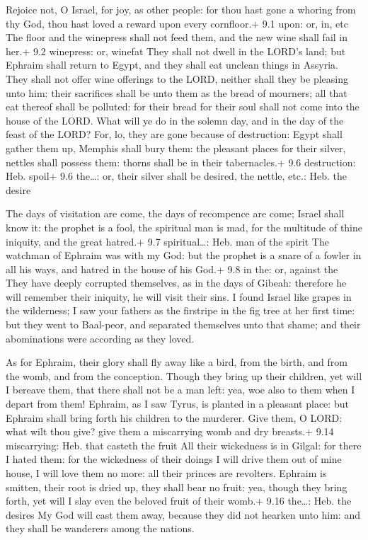  Rejoice not, O Israel, for joy, as other people: for thou
hast gone a whoring from thy God, thou hast loved a reward upon every
cornfloor.+ 9.1 upon: or, in, etc  The floor and the
winepress shall not feed them, and the new wine shall fail in her.+ 9.2
winepress: or, winefat  They shall not dwell in the LORD's
land; but Ephraim shall return to Egypt, and they shall eat unclean
things in Assyria.  They shall not offer wine offerings to
the LORD, neither shall they be pleasing unto him: their sacrifices
shall be unto them as the bread of mourners; all that eat thereof shall
be polluted: for their bread for their soul shall not come into the
house of the LORD.  What will ye do in the solemn day, and
in the day of the feast of the LORD?  For, lo, they are gone
because of destruction: Egypt shall gather them up, Memphis shall bury
them: the pleasant places for their silver, nettles shall possess them:
thorns shall be in their tabernacles.+ 9.6 destruction: Heb. spoil+ 9.6
the\ldots: or, their silver shall be desired, the nettle, etc.: Heb. the
desire

 The days of visitation are come, the days of recompence are
come; Israel shall know it: the prophet is a fool, the spiritual man is
mad, for the multitude of thine iniquity, and the great hatred.+ 9.7
spiritual\ldots: Heb. man of the spirit  The watchman of
Ephraim was with my God: but the prophet is a snare of a fowler in all
his ways, and hatred in the house of his God.+ 9.8 in the: or, against
the  They have deeply corrupted themselves, as in the days
of Gibeah: therefore he will remember their iniquity, he will visit
their sins.  I found Israel like grapes in the wilderness;
I saw your fathers as the firstripe in the fig tree at her first time:
but they went to Baal-peor, and separated themselves unto that shame;
and their abominations were according as they loved.

 As for Ephraim, their glory shall fly away like a bird,
from the birth, and from the womb, and from the conception.
 Though they bring up their children, yet will I bereave
them, that there shall not be a man left: yea, woe also to them when I
depart from them!  Ephraim, as I saw Tyrus, is planted in a
pleasant place: but Ephraim shall bring forth his children to the
murderer.  Give them, O LORD: what wilt thou give? give
them a miscarrying womb and dry breasts.+ 9.14 miscarrying: Heb. that
casteth the fruit  All their wickedness is in Gilgal: for
there I hated them: for the wickedness of their doings I will drive them
out of mine house, I will love them no more: all their princes are
revolters.  Ephraim is smitten, their root is dried up,
they shall bear no fruit: yea, though they bring forth, yet will I slay
even the beloved fruit of their womb.+ 9.16 the\ldots: Heb. the desires
 My God will cast them away, because they did not hearken
unto him: and they shall be wanderers among the nations.

